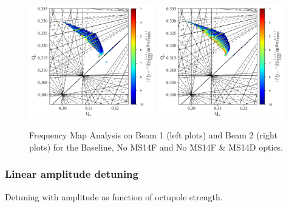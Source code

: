 \documentclass{cernatsnote}
\begin{document}
\begin{figure}[h!]
\includegraphics[width=0.49\textwidth]{images/fma_noms14fms14daltb1.png} \hfill \includegraphics[width=0.49\textwidth]{images/fma_noms14fms14daltb2.png} \\
\caption{\label{fma_all} Frequency Map Analysis on Beam 1 (left plots) and Beam 2 (right plots) for the Baseline, No MS14F and No MS14F \& MS14D optics.}
\end{figure}

\subsubsection{Linear amplitude detuning}

Detuning with amplitude as function of octupole strength.
\end{document}
